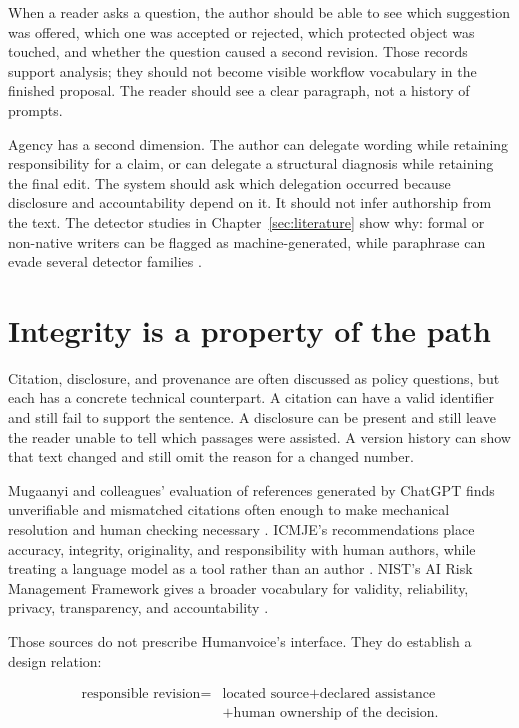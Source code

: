 When a reader asks a question, the author should be able to see which suggestion
was offered, which one was accepted or rejected, which protected object was
touched, and whether the question caused a second revision. Those records
support analysis; they should not become visible workflow vocabulary in the
finished proposal. The reader should see a clear paragraph, not a history of
prompts.

Agency has a second dimension. The author can delegate wording while retaining
responsibility for a claim, or can delegate a structural diagnosis while
retaining the final edit. The system should ask which delegation occurred
because disclosure and accountability depend on it. It should not infer
authorship from the text. The detector studies in Chapter~\ref{sec:literature}
show why: formal or non-native writers can be flagged as machine-generated,
while paraphrase can evade several detector families
\citep{liang2023detectors,krishna2023paraphrasing}.

\section{Integrity is a property of the path}
\label{sec:lit-integrity}

Citation, disclosure, and provenance are often discussed as policy questions,
but each has a concrete technical counterpart. A citation can have a valid
identifier and still fail to support the sentence. A disclosure can be present
and still leave the reader unable to tell which passages were assisted. A
version history can show that text changed and still omit the reason for a
changed number.

Mugaanyi and colleagues' evaluation of references generated by ChatGPT finds
unverifiable and mismatched citations often enough to make mechanical
resolution and human checking necessary \citep{mugaanyi2024citation}. ICMJE's
recommendations place accuracy, integrity, originality, and responsibility
with human authors, while treating a language model as a tool rather than an
author \citep{icmje2025ai}. NIST's AI Risk Management Framework gives a broader
vocabulary for validity, reliability, privacy, transparency, and accountability
\citep{nist2023airmf}.

Those sources do not prescribe Humanvoice's interface. They do establish a
design relation:

\begin{equation}
  \begin{aligned}
  \text{responsible revision} ={}&\text{located source}
      +\text{declared assistance}\\[-1pt]
      &+\text{human ownership of the decision}.
  \end{aligned}
  \label{eq:lit-integrity-relation}
\end{equation}

